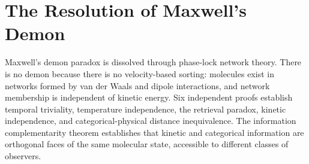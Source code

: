\chapter{The Resolution of Maxwell's Demon}
\label{ch:maxwell_resolution}


\begin{chapterabstract}
Maxwell's demon paradox is dissolved through phase-lock network theory. There is no demon because there is no velocity-based sorting: molecules exist in networks formed by van der Waals and dipole interactions, and network membership is independent of kinetic energy. Six independent proofs establish temporal triviality, temperature independence, the retrieval paradox, kinetic independence, and categorical-physical distance inequivalence. The information complementarity theorem establishes that kinetic and categorical information are orthogonal faces of the same molecular state, accessible to different classes of observers.
\end{chapterabstract}



